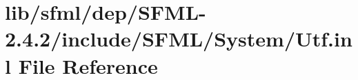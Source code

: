 \hypertarget{sfml_2dep_2_s_f_m_l-2_84_82_2include_2_s_f_m_l_2_system_2_utf_8inl}{\section{lib/sfml/dep/\-S\-F\-M\-L-\/2.4.2/include/\-S\-F\-M\-L/\-System/\-Utf.inl File Reference}
\label{sfml_2dep_2_s_f_m_l-2_84_82_2include_2_s_f_m_l_2_system_2_utf_8inl}
}
